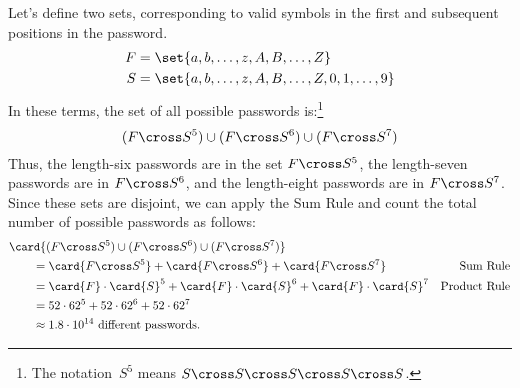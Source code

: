 Let's define two sets, corresponding to valid symbols in the first and
subsequent positions in the password.
%
\begin{align*}
F & = \set{ a, b, \ldots, z, A, B, \ldots, Z } \\
S & = \set{ a, b, \ldots, z, A, B, \ldots, Z, 0, 1, \ldots, 9 }
\end{align*}
%
In these terms, the set of all possible passwords is:\footnote{The
  notation~$S^5$ means $S \cross S \cross S \cross S \cross S$.}
%
\[
(F \cross S^5) \cup (F \cross S^6) \cup (F \cross S^7)
\]
%
Thus, the length-six passwords are in the set $F \cross S^5$, the
length-seven passwords are in $F \cross S^6$, and the length-eight
passwords are in $F \cross S^7$.  Since these sets are disjoint, we
can apply the Sum Rule and count the total number of possible
passwords as follows:
%
\begin{align*}
\lefteqn{\card{(F \cross S^5) \cup (F \cross S^6) \cup (F \cross S^7)}}
\qquad & \\
    & = \card{F \cross S^5} + \card{F \cross S^6} + \card{F \cross S^7}
        & \text{Sum Rule} \\
    & = \card{F} \cdot \card{S}^5 +
          \card{F} \cdot \card{S}^6 +
          \card{F} \cdot \card{S}^7
        & \text{Product Rule} \\
    & = 52 \cdot 62^5 + 52 \cdot 62^6 + 52 \cdot 62^7 \\
    & \approx 1.8 \cdot 10^{14} \text{ different passwords}.
\end{align*}



\begin{problems}
\practiceproblems
{}

\classproblems
{}
\end{problems}


